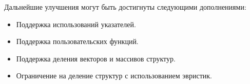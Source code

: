 Дальнейшие улучшения могут быть достигнуты следующими дополнениями:
\begin{itemize}
    \item Поддержка использований указателей.
    \item Поддержка пользовательских функций.
    \item Поддержка деления векторов и массивов структур.
    \item Ограничение на деление структур с использованием эвристик.
\end{itemize}